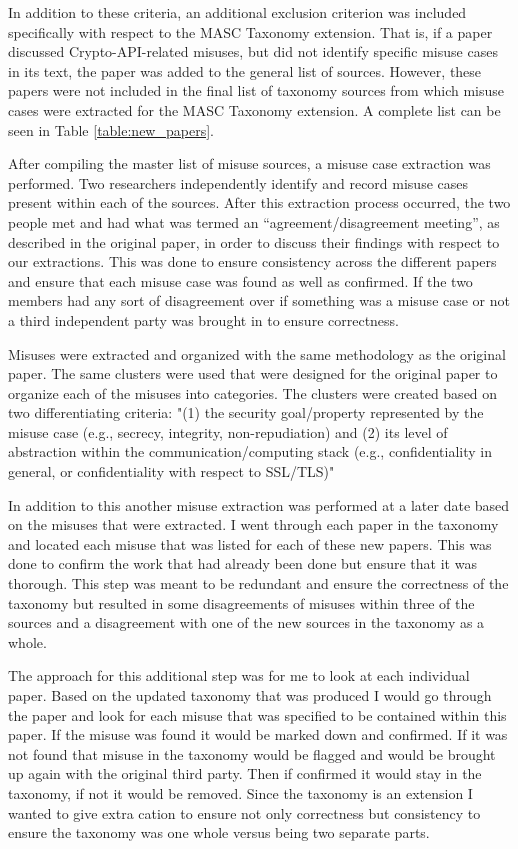 In addition to these criteria, an additional exclusion criterion was included specifically with respect to the MASC Taxonomy extension.  That is, if a paper discussed Crypto-API-related misuses, but did not identify specific misuse cases in its text, the paper was added to the general list of sources.  However, these papers were not included in the final list of taxonomy sources from which misuse cases were extracted for the MASC Taxonomy extension. A complete list can be seen in Table \ref{table:new_papers}.



After compiling the master list of misuse sources, a misuse case extraction was performed. Two researchers independently identify and record misuse cases present within each of the sources. After this extraction process occurred, the two people met and had what was termed an “agreement/disagreement meeting”, as described in the original paper, in order to discuss their findings with respect to our extractions.  This was done to ensure consistency across the different papers and ensure that each misuse case was found as well as confirmed. If the two members had any sort of disagreement over if something was a misuse case or not a third independent party was brought in to ensure correctness. 

Misuses were extracted and organized with the same methodology as the original paper. The same clusters were used that were designed for the original paper to organize each of the misuses into categories. The clusters were created based on two differentiating criteria: "(1) the security goal/property represented by the misuse case  (e.g., secrecy, integrity, non-repudiation) and (2) its level of abstraction within the communication/computing stack (e.g., confidentiality in general, or confidentiality with respect to SSL/TLS)"
    
In addition to this another misuse extraction was performed at a later date based on the misuses that were extracted. I went through each paper in the taxonomy and located each misuse that was listed for each of these new papers. This was done to confirm the work that had already been done but ensure that it was thorough. This step was meant to be redundant and ensure the correctness of the taxonomy but resulted in some disagreements of misuses within three of the sources and a disagreement with one of the new sources in the taxonomy as a whole. 

The approach for this additional step was for me to look at each individual paper. Based on the updated taxonomy that was produced I would go through the paper and look for each misuse that was specified to be contained within this paper. If the misuse was found it would be marked down and confirmed. If it was not found that misuse in the taxonomy would be flagged and would be brought up again with the original third party. Then if confirmed it would stay in the taxonomy, if not it would be removed. Since the taxonomy is an extension I wanted to give extra cation to ensure not only correctness but consistency to ensure the taxonomy was one whole versus being two separate parts.
  
